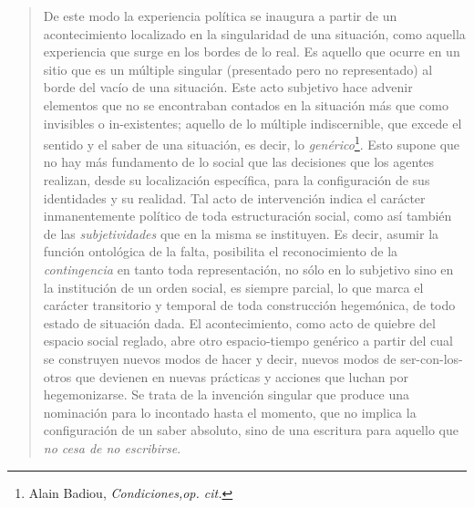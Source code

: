 \begin{quote}
De este modo la experiencia política se inaugura a partir de un acontecimiento localizado en la singularidad de una situación, como aquella experiencia que surge en los bordes de lo real. Es aquello que ocurre en un sitio que es un múltiple singular (presentado pero no representado) al borde del vacío de una situación. Este acto subjetivo hace advenir elementos que no se encontraban contados en la situación más que como invisibles o in-existentes; aquello de lo múltiple indiscernible, que excede el sentido y el saber de una situación, es decir, lo \emph{genérico}\footnote{Alain Badiou, \emph{Condiciones,op. cit.}}. Esto supone que no hay más fundamento de lo social que las decisiones que los agentes realizan, desde su localización específica, para la configuración de sus identidades y su realidad. Tal acto de intervención indica el carácter inmanentemente político de toda estructuración social, como así también de las \emph{subjetividades} que en la misma se instituyen. Es decir, asumir la función ontológica de la falta, posibilita el reconocimiento de la \emph{contingencia} en tanto toda representación, no sólo en lo subjetivo sino en la institución de un orden social, es siempre parcial, lo que marca el carácter transitorio y temporal de toda construcción hegemónica, de todo estado de situación dada. El acontecimiento, como acto de quiebre del espacio social reglado, abre otro espacio-tiempo genérico a partir del cual se construyen nuevos modos de hacer y decir, nuevos modos de ser-con-los-otros que devienen en nuevas prácticas y acciones que luchan por hegemonizarse. Se trata de la invención singular que produce una nominación para lo incontado hasta el momento, que no implica la configuración de un saber absoluto, sino de una escritura para aquello que \emph{no cesa de no escribirse}.


\end{quote}
